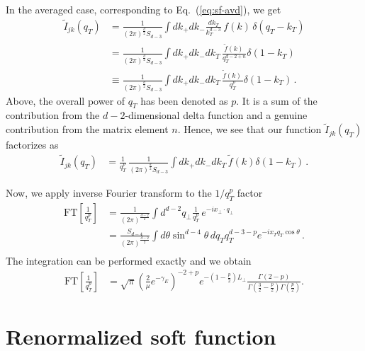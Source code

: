 \documentclass[a4paper,11pt]{report}
\numberwithin{equation}{section}
\begin{document}
%
In the averaged case, corresponding to Eq.~(\ref{eq:sf-avd}),
we get~\cite{mymath}
%
\begin{align}
  \tilde I_{jk}(q_T) 
  & = 
  \frac{1}{\left(2\pi\right)^{\frac{d}{2}} S_{d-3}}
  \int dk_+ dk_- \frac{dk_T}{k_T^{d-3}}\, f(k)\, \delta(q_T-k_T)
  \nonumber \\
  & = 
  \frac{1}{\left(2\pi\right)^{\frac{d}{2}} S_{d-3}}
  \int dk_+ dk_- dk_T\, \frac{\tilde f(k)\,}{q_T^{d-2+n}} \delta(1-k_T)
  \nonumber \\
  & \equiv
  \frac{1}{\left(2\pi\right)^{\frac{d}{2}} S_{d-3}}
  \int dk_+ dk_- dk_T\, \frac{\tilde f(k)\,}{q_T^{p}} \delta(1-k_T)\,.
\end{align}
%
Above, the overall power of $q_T$ has been denoted as $p$. It is a sum of the
contribution from the $d-2$-dimensional delta function and a genuine
contribution from the matrix element $n$.
%
Hence, we see that our function $\tilde I_{jk}(q_T)$ factorizes as
%
\begin{align}
  \tilde I_{jk}(q_T) 
  & = 
  \frac{1}{q_T^{p}}  \,
  \frac{1}{\left(2\pi\right)^{\frac{d}{2}} S_{d-3}}
  \int dk_+ dk_- dk_T\, \tilde f(k)\delta(1-k_T)\,.
\end{align}

Now, we apply inverse Fourier transform to the $1/q_T^p$  factor
%
\begin{align}
  \text{FT}\left[\frac{1}{q_T^p}\right] 
   & =
  \frac{1}{\left(2\pi\right)^{\frac{d-2}{2}}}
  \int d^{d-2} q_\perp \frac{1}{q_T^p} \, e^{-i x_\perp \cdot q_\perp}
  \nonumber \\
   & =
  \frac{S_{d-4}}{\left(2\pi\right)^{\frac{d-2}{2}}}
  \int d\theta \sin^{d-4}\theta\, dq_T q_T^{d-3-p} e^{-i x_T q_T \cos\theta}\,.
  \nonumber \\
\end{align}
%
The integration can be performed exactly and we obtain
\begin{align}
  \text{FT}\left[\frac{1}{q_T^p}\right] 
   & =
   \sqrt{\pi}
   \left(\frac{2}{\mu}e^{-\gamma_E}\right)^{-2+p}
   e^{-(1-\frac{p}{2})L_\perp}
   \frac{\Gamma(2-p)}{\Gamma\left(\frac{3}{2}-
   \frac{p}{2}\right)\Gamma\left(\frac{p}{2}\right)}.
\end{align}

\section{Renormalized soft function}
\end{document}

